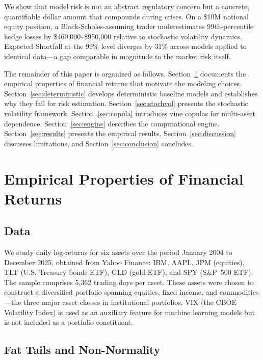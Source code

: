 \documentclass[11pt,a4paper]{article}
\begin{document}
We show that model risk is not an abstract regulatory concern but a concrete, quantifiable dollar amount that compounds during crises.
On a \$10M notional equity position, a Black-Scholes-assuming trader underestimates 99th-percentile hedge losses by \$460{,}000--\$950{,}000 relative to stochastic volatility dynamics.
Expected Shortfall at the 99\% level diverges by 31\% across models applied to identical data---a gap comparable in magnitude to the market risk itself.

The remainder of this paper is organized as follows.
Section~\ref{sec:eda} documents the empirical properties of financial returns that motivate the modeling choices.
Section~\ref{sec:deterministic} develops deterministic baseline models and establishes why they fail for risk estimation.
Section~\ref{sec:stochvol} presents the stochastic volatility framework.
Section~\ref{sec:copula} introduces vine copulas for multi-asset dependence.
Section~\ref{sec:engine} describes the computational engine.
Section~\ref{sec:results} presents the empirical results.
Section~\ref{sec:discussion} discusses limitations, and Section~\ref{sec:conclusion} concludes.


\section{Empirical Properties of Financial Returns}
\label{sec:eda}

\subsection{Data}
\label{sec:data}

We study daily log-returns for six assets over the period January 2004 to December 2025, obtained from Yahoo Finance: IBM, AAPL, JPM (equities), TLT (U.S. Treasury bonds ETF), GLD (gold ETF), and SPY (S\&P~500 ETF).
The sample comprises 5{,}362 trading days per asset.
These assets were chosen to construct a diversified portfolio spanning equities, fixed income, and commodities---the three major asset classes in institutional portfolios.
VIX (the CBOE Volatility Index) is used as an auxiliary feature for machine learning models but is not included as a portfolio constituent.

\subsection{Fat Tails and Non-Normality}
\label{sec:fattails}
\end{document}
